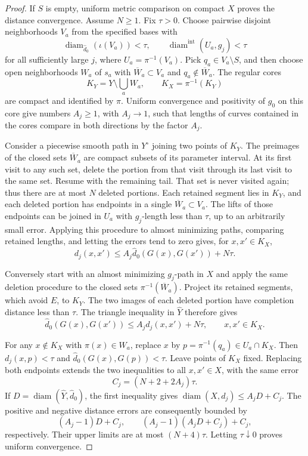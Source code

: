 \begin{proof}
If $S$ is empty, uniform metric comparison on compact $X$ proves the distance convergence. Assume $N\geq1$. Fix $\tau>0$. Choose pairwise disjoint neighborhoods $V_a$ from the specified bases with
\[
 \operatorname{diam}_{\widehat d_0}(\iota(V_a))<\tau,
 \qquad \operatorname{diam}^{\mathrm{int}}(U_a,g_j)<\tau
\]
for all sufficiently large $j$, where $U_a=\pi^{-1}(V_a)$. Pick $q_a\in V_a\setminus S$, and then choose open neighborhoods $W_a$ of $s_a$ with $\overline W_a\subset V_a$ and $q_a\notin\overline W_a$. The regular cores
\[
 K_Y=Y\setminus\bigcup_a W_a,
 \qquad K_X=\pi^{-1}(K_Y)
\]
are compact and identified by $\pi$. Uniform convergence and positivity of $g_0$ on this core give numbers $A_j\geq1$, with $A_j\to1$, such that lengths of curves contained in the cores compare in both directions by the factor $A_j$.

Consider a piecewise smooth path in $Y^\circ$ joining two points of $K_Y$. The preimages of the closed sets $\overline W_a$ are compact subsets of its parameter interval. At its first visit to any such set, delete the portion from that visit through its last visit to the same set. Resume with the remaining tail. That set is never visited again; thus there are at most $N$ deleted portions. Each retained segment lies in $K_Y$, and each deleted portion has endpoints in a single $\overline W_a\subset V_a$. The lifts of those endpoints can be joined in $U_a$ with $g_j$-length less than $\tau$, up to an arbitrarily small error. Applying this procedure to almost minimizing paths, comparing retained lengths, and letting the errors tend to zero gives, for $x,x'\in K_X$,
\[
 d_j(x,x')\leq A_j\widehat d_0(G(x),G(x'))+N\tau.
\]

Conversely start with an almost minimizing $g_j$-path in $X$ and apply the same deletion procedure to the closed sets $\pi^{-1}(\overline W_a)$. Project its retained segments, which avoid $E$, to $K_Y$. The two images of each deleted portion have completion distance less than $\tau$. The triangle inequality in $\widehat Y$ therefore gives
\[
 \widehat d_0(G(x),G(x'))\leq A_j d_j(x,x')+N\tau,
 \qquad x,x'\in K_X.
\]

For any $x\notin K_X$ with $\pi(x)\in W_a$, replace $x$ by $p=\pi^{-1}(q_a)\in U_a\cap K_X$. Then $d_j(x,p)<\tau$ and $\widehat d_0(G(x),G(p))<\tau$. Leave points of $K_X$ fixed. Replacing both endpoints extends the two inequalities to all $x,x'\in X$, with the same error
\[
 C_j=(N+2+2A_j)\tau.
\]
If $D=\operatorname{diam}(\widehat Y,\widehat d_0)$, the first inequality gives $\operatorname{diam}(X,d_j)\leq A_jD+C_j$. The positive and negative distance errors are consequently bounded by
\[
 (A_j-1)D+C_j,
 \qquad (A_j-1)(A_jD+C_j)+C_j,
\]
respectively. Their upper limits are at most $(N+4)\tau$. Letting $\tau\downarrow0$ proves uniform convergence.


\end{proof}
